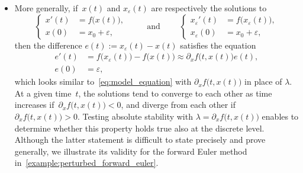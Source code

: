 \begin{itemize}
    \item
        More generally, if~$x(t)$ and $x_{\varepsilon}(t)$ are respectively the solutions to
        \begin{equation}
            \label{eq:multiscale_autonomous}
            \left\{
            \begin{aligned}
                x'(t) &= f\bigl(x(t)\bigr), \\
                x(0) &= x_0 + \varepsilon,
            \end{aligned}
            \right.
            \qquad
            \text{ and }
            \qquad
            \left\{
            \begin{aligned}
                x_{\varepsilon}'(t) &= f\bigl(x_{\varepsilon}(t)\bigr), \\
                x_{\varepsilon}(0) &= x_0 + \varepsilon,
            \end{aligned}
            \right.
        \end{equation}
        then the difference $e(t) := x_{\varepsilon}(t) - x(t)$ satisfies the equation
        \begin{equation}
            \label{eq:ode_error_equation}
            \begin{aligned}
                e'(t) &= f\bigl(x_{\varepsilon}(t)\bigr) - f\bigl(x(t)\bigr) \approx \partial_x f\bigl(t,x(t)\bigr) e(t), \\
                e(0) &= \varepsilon,
            \end{aligned}
        \end{equation}
        which looks similar to~\eqref{eq:model_equation} with $\partial_x f\bigl(t,x(t)\bigr)$ in place of $\lambda$.
        At a given time~$t$,
        the solutions tend to converge to each other as time increases
        if~$\partial_x f\bigl(t, x(t)\bigr) < 0$,
        and diverge from each other if $\partial_x f\bigl(t, x(t)\bigr) > 0$.
        Testing absolute stability with $\lambda = \partial_x f\bigl(t, x(t)\bigr)$ enables to determine whether this property holds true also at the discrete level.
        Although the latter statement is difficult to state precisely and prove generally,
        we illustrate its validity for the forward Euler method in~\cref{example:perturbed_forward_euler}.
\end{itemize}

